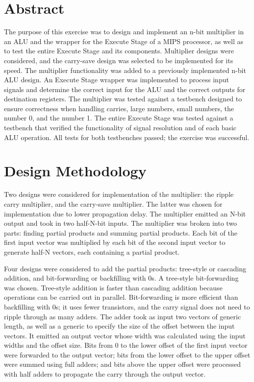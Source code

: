 \documentclass[CMPE]{KGCOEReport}
\begin{document}
\maketitle

\section*{Abstract}

The purpose of this exercise was to design and implement an n-bit multiplier
in an ALU and the wrapper for the Execute Stage of a MIPS processor, as well as
to test the entire Execute Stage and its components. Multiplier designs were
considered, and the carry-save design was selected to be implemented for its
speed. The multiplier functionality was added to a previously implemented n-bit
ALU design. An Execute Stage wrapper was implemented to process input signals
and determine the correct input for the ALU and the correct outputs for
destination registers. The multiplier was tested against a testbench designed
to ensure correctness when handling carries, large numbers, small numbers, the
number 0, and the number 1. The entire Execute Stage was tested against a
testbench that verified the functionality of signal resolution and of each
basic ALU operation. All tests for both testbenches passed; the exercise was
successful.

\section*{Design Methodology}

Two designs were considered for implementation of the multiplier: the ripple
carry multiplier, and the carry-save multiplier. The latter was chosen for
implementation due to lower propagation delay. The multiplier emitted an N-bit
output and took in two half-N-bit inputs. The multiplier was broken into two
parts: finding partial products and summing partial products. Each bit of the
first input vector was multiplied by each bit of the second input vector to
generate half-N vectors, each containing a partial product.

Four designs were considered to add the partial products: tree-style or
cascading addition, and bit-forwarding or backfilling with 0s. A tree-style
bit-forwarding was chosen. Tree-style addition is faster than cascading
addition because operations can be carried out in parallel. Bit-forwarding is
more efficient than backfilling with 0s; it uses fewer transistors, and the
carry signal does not need to ripple through as many adders. The adder took as
input two vectors of generic length, as well as a generic to specify the size
of the offset between the input vectors. It emitted an output vector whose
width was calculated using the input widths and the offset size. Bits from 0 to
the lower offset of the first input vector were forwarded to the output vector;
bits from the lower offset to the upper offset were summed using full adders;
and bits above the upper offset were processed with half adders to propagate
the carry through the output vector.
\end{document}
